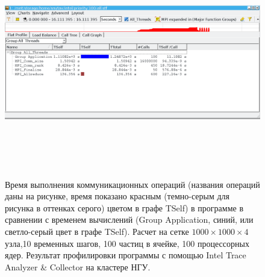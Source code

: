 \begin{figure}[h]
	\begin{center}
		\includegraphics[height=10cm,keepaspectratio]{images/scalingNSU-img18.png}
		\caption{
		 Время выполнения коммуникационных операций (названия операций даны на рисунке, время показано красным (темно-серым для рисунка в оттенках серого) цветом в графе TSelf) в программе в сравнении с временем вычислений (Group Application, синий, или светло-серый цвет в графе TSelf). Расчет на сетке $1000\times1000\times4$ узла,10 временных шагов, 100 частиц в ячейке,  100 процессорных ядер. Результат профилировки программы с помощью Intel Trace Analyzer \& Collector на кластере НГУ.
		}
		\label{scale9}
	\end{center} 
\end{figure}	    
	   
